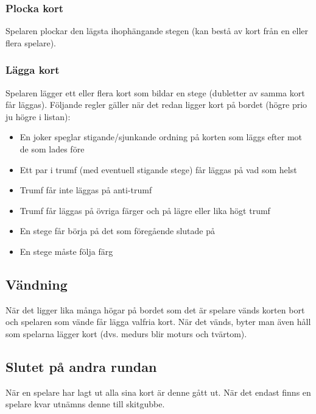 \documentclass[a4paper,12pt]{article}
\begin{document}
\subsubsection{Plocka kort}
Spelaren plockar den lägsta ihophängande stegen (kan bestå av kort från en eller flera spelare).

\subsubsection{Lägga kort}
Spelaren lägger ett eller flera kort som bildar en stege (dubletter av samma kort får läggas). Följande regler gäller när det redan ligger kort på bordet (högre prio ju högre i listan):
\begin{itemize}
  \item En joker speglar stigande/sjunkande ordning på korten som läggs efter mot de som lades före
  \item Ett par i trumf (med eventuell stigande stege) får läggas på vad som helst
  \item Trumf får inte läggas på anti-trumf
  \item Trumf får läggas på övriga färger och på lägre eller lika högt trumf
  \item En stege får börja på det som föregående slutade på
  \item En stege måste följa färg
\end{itemize}

\subsection{Vändning}
När det ligger lika många högar på bordet som det är spelare vänds korten bort och spelaren som vände får lägga valfria kort. När det vänds, byter man även håll som spelarna lägger kort (dvs. medurs blir moturs och tvärtom).

\subsection{Slutet på andra rundan}
När en spelare har lagt ut alla sina kort är denne gått ut. När det endast finns en spelare kvar utnämns denne till skitgubbe.
\end{document}
